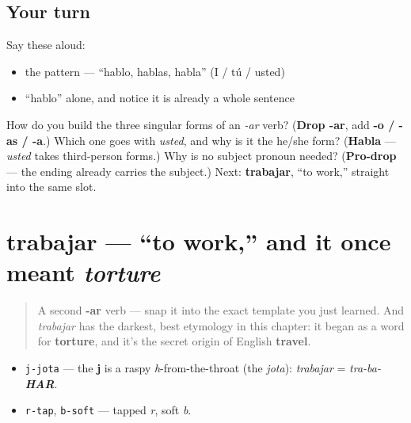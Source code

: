 \subsection*{Your turn}
Say these aloud:

\begin{itemize}
\raggedright
  \item the pattern — \textquotedblleft{}hablo, hablas, habla\textquotedblright{} (I / tú / usted)
  \item \textquotedblleft{}hablo\textquotedblright{} alone, and notice it is already a whole sentence
\end{itemize}

\begin{tcolorbox}[breakable,colback=teal!4,colframe=teal!35!black,title={Before you move on}]
How do you build the three singular forms of an \emph{-ar} verb? (\textbf{Drop -ar}, add \textbf{-o / -as / -a}.) Which one goes with \emph{usted}, and why is it the he/she form? (\textbf{Habla} — \emph{usted} takes third-person forms.) Why is no subject pronoun needed? (\textbf{Pro-drop} — the ending already carries the subject.) Next: \textbf{trabajar}, \textquotedblleft{}to work,\textquotedblright{} straight into the same slot.
\end{tcolorbox}
\section[trabajar]{trabajar — \textquotedblleft{}to work,\textquotedblright{} and it once meant \emph{torture}}

\label{lesson:ES-C06-trabajar}



\begin{quote}
A second \textbf{-ar} verb — snap it into the exact template you just learned. And \emph{trabajar} has the darkest, best etymology in this chapter: it began as a word for \textbf{torture}, and it's the secret origin of English \textbf{travel}.
\end{quote}

\begin{sounds}
\begin{itemize}
\raggedright
  \item \texttt{j-jota} — the \textbf{j} is a raspy \emph{h}-from-the-throat (the \emph{jota}): \emph{trabajar} = \emph{tra-ba-\textbf{HAR}}.
  \item \texttt{r-tap}, \texttt{b-soft} — tapped \emph{r}, soft \emph{b}.
\end{itemize}
\end{sounds}

